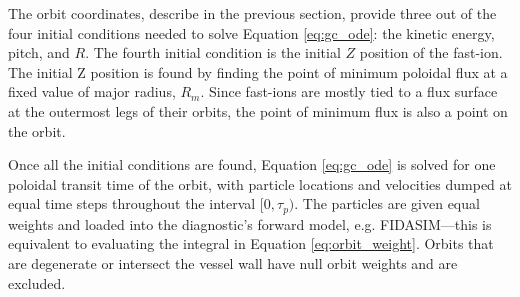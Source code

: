 The orbit coordinates, describe in the previous section, provide three out of the four initial conditions needed to solve Equation \ref{eq:gc_ode}: the kinetic energy, pitch, and $R$. The fourth initial condition is the initial $Z$ position of the fast-ion. The initial Z position is found by finding the point of minimum poloidal flux at a fixed value of major radius, $R_m$. Since fast-ions are mostly tied to a flux surface at the outermost legs of their orbits, the point of minimum flux is also a point on the orbit.

Once all the initial conditions are found, Equation \ref{eq:gc_ode} is solved for one poloidal transit time of the orbit, with particle locations and velocities dumped at equal time steps throughout the interval $[0,\tau_p)$. The particles are given equal weights and loaded into the diagnostic's forward model, e.g. FIDASIM---this is equivalent to evaluating the integral in Equation \ref{eq:orbit_weight}. Orbits that are degenerate or intersect the vessel wall have null orbit weights and are excluded.

